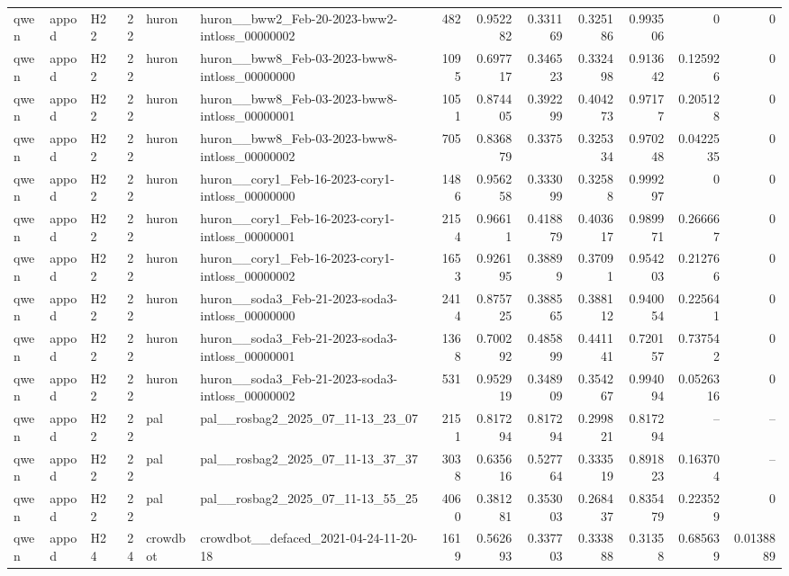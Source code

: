 \begin{longtable}{lllrllrrrrrrr}
qwen & appod & H22 & 22 & huron & huron\_\_bww2\_Feb-20-2023-bww2-intloss\_00000002 & 482 & 0.952282 & 0.331169 & 0.325186 & 0.993506 & 0 & 0 \\
qwen & appod & H22 & 22 & huron & huron\_\_bww8\_Feb-03-2023-bww8-intloss\_00000000 & 1095 & 0.697717 & 0.346523 & 0.332498 & 0.913642 & 0.125926 & 0 \\
qwen & appod & H22 & 22 & huron & huron\_\_bww8\_Feb-03-2023-bww8-intloss\_00000001 & 1051 & 0.874405 & 0.392299 & 0.404273 & 0.97177 & 0.205128 & 0 \\
qwen & appod & H22 & 22 & huron & huron\_\_bww8\_Feb-03-2023-bww8-intloss\_00000002 & 705 & 0.836879 & 0.3375 & 0.325334 & 0.970248 & 0.0422535 & 0 \\
qwen & appod & H22 & 22 & huron & huron\_\_cory1\_Feb-16-2023-cory1-intloss\_00000000 & 1486 & 0.956258 & 0.333099 & 0.32588 & 0.999297 & 0 & 0 \\
qwen & appod & H22 & 22 & huron & huron\_\_cory1\_Feb-16-2023-cory1-intloss\_00000001 & 2154 & 0.96611 & 0.418879 & 0.403617 & 0.989971 & 0.266667 & 0 \\
qwen & appod & H22 & 22 & huron & huron\_\_cory1\_Feb-16-2023-cory1-intloss\_00000002 & 1653 & 0.926195 & 0.38899 & 0.37091 & 0.954203 & 0.212766 & 0 \\
qwen & appod & H22 & 22 & huron & huron\_\_soda3\_Feb-21-2023-soda3-intloss\_00000000 & 2414 & 0.875725 & 0.388565 & 0.388112 & 0.940054 & 0.225641 & 0 \\
qwen & appod & H22 & 22 & huron & huron\_\_soda3\_Feb-21-2023-soda3-intloss\_00000001 & 1368 & 0.700292 & 0.485899 & 0.441141 & 0.720157 & 0.737542 & 0 \\
qwen & appod & H22 & 22 & huron & huron\_\_soda3\_Feb-21-2023-soda3-intloss\_00000002 & 531 & 0.952919 & 0.348909 & 0.354267 & 0.994094 & 0.0526316 & 0 \\
qwen & appod & H22 & 22 & pal & pal\_\_rosbag2\_2025\_07\_11-13\_23\_07 & 2151 & 0.817294 & 0.817294 & 0.299821 & 0.817294 & -- & -- \\
qwen & appod & H22 & 22 & pal & pal\_\_rosbag2\_2025\_07\_11-13\_37\_37 & 3038 & 0.635616 & 0.527764 & 0.333519 & 0.891823 & 0.163704 & -- \\
qwen & appod & H22 & 22 & pal & pal\_\_rosbag2\_2025\_07\_11-13\_55\_25 & 4060 & 0.381281 & 0.353003 & 0.268437 & 0.835479 & 0.223529 & 0 \\
qwen & appod & H24 & 24 & crowdbot & crowdbot\_\_defaced\_2021-04-24-11-20-18 & 1619 & 0.562693 & 0.337703 & 0.333888 & 0.31358 & 0.685639 & 0.0138889 \\

\end{longtable}
